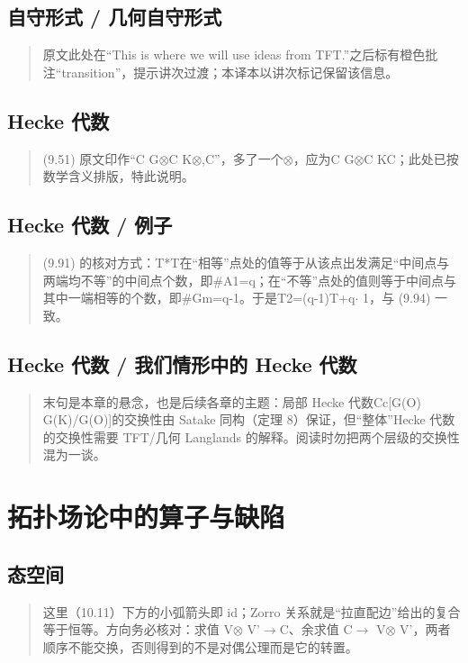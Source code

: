 \subsection*{自守形式 / 几何自守形式}
\begin{quote}\small
原文此处在“This is where we will use ideas from TFT.”之后标有橙色批注“transition”，提示讲次过渡；本译本以讲次标记保留该信息。
\end{quote}

\subsection*{Hecke 代数}
\begin{quote}\small
(9.51) 原文印作“C G$\otimes$C K$\otimes$,C”，多了一个$\otimes$，应为C G$\otimes$C KC；此处已按数学含义排版，特此说明。
\end{quote}

\subsection*{Hecke 代数 / 例子}
\begin{quote}\small
(9.91) 的核对方式：T*T在“相等”点处的值等于从该点出发满足“中间点与两端均不等”的中间点个数，即\#A1=q；在“不等”点处的值则等于中间点与其中一端相等的个数，即\#Gm=q-1。于是T2=(q-1)T+q$\cdot$ 1，与 (9.94) 一致。
\end{quote}

\subsection*{Hecke 代数 / 我们情形中的 Hecke 代数}
\begin{quote}\small
末句是本章的悬念，也是后续各章的主题：局部 Hecke 代数Cc[G(O) G(K)/G(O)]的交换性由 Satake 同构（定理 8）保证，但“整体”Hecke 代数的交换性需要 TFT/几何 Langlands 的解释。阅读时勿把两个层级的交换性混为一谈。
\end{quote}

\section{拓扑场论中的算子与缺陷}
\subsection*{态空间}
\begin{quote}\small
这里（10.11）下方的小弧箭头即 id；Zorro 关系就是“拉直配边”给出的复合等于恒等。方向务必核对：求值 V$\otimes$ V'$\to$C、余求值 C$\to$ V$\otimes$ V'，两者顺序不能交换，否则得到的不是对偶公理而是它的转置。
\end{quote}

